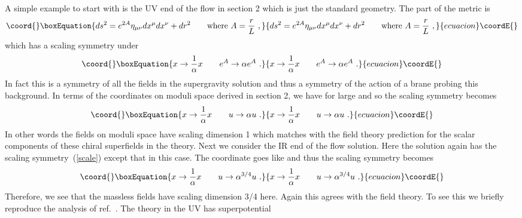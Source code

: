 \documentclass[a4paper,12pt]{article}
\providecommand{\labell}[1]{\label{#1}}
\begin{document}
A simple example to start with is the UV end of the flow in section 2
which is just the standard \coordHE{} geometry. The \coordHE{}
part of the metric is
\begin{equation}\coord{}\boxEquation{
  ds^2 = e^{2A} \eta_{\mu \nu} dx^\mu dx^\nu + dr^2 \qquad \mbox{where  } A = {r \over L}\ ,
}{
  ds^2 = e^{2A} \eta_{\mu \nu} dx^\mu dx^\nu + dr^2 \qquad \mbox{where  } A = {r \over L}\ ,
}{ecuacion}\coordE{}\end{equation}
which has a scaling symmetry under 
\begin{equation}\coord{}\boxEquation{
  x \rightarrow {1 \over \alpha} x \qquad e^{A} \rightarrow \alpha e^{A}\ .
  \labell{scale}
}{
  x \rightarrow {1 \over \alpha} x \qquad e^{A} \rightarrow \alpha e^{A}\ .
  \labell{scale}
}{ecuacion}\coordE{}\end{equation}
In fact this is a symmetry of all the fields in the supergravity
solution and thus a symmetry of the action of a brane probing this
background.  In terms of the coordinates on moduli space derived in
section 2, we have \coordHE{} for large \coordHE{} and so the scaling
symmetry becomes
\begin{equation}\coord{}\boxEquation{
 x \rightarrow {1 \over \alpha} x \qquad u \rightarrow \alpha u\  .
}{
 x \rightarrow {1 \over \alpha} x \qquad u \rightarrow \alpha u\  .
}{ecuacion}\coordE{}\end{equation}
In other words the fields on moduli space have scaling dimension 1
which matches with the field theory prediction for the scalar
components of these chiral superfields in the \coordHE{} theory.
Next we consider the IR end of the flow solution. Here the solution
again has the scaling symmetry~(\ref{scale}) except that \coordHE{} in this case. The coordinate \coordHE{} goes like \coordHE{} and thus the
scaling symmetry becomes
\begin{equation}\coord{}\boxEquation{
 x \rightarrow {1 \over \alpha} x \qquad u \rightarrow \alpha^{3/4} u\ .
}{
 x \rightarrow {1 \over \alpha} x \qquad u \rightarrow \alpha^{3/4} u\ .
}{ecuacion}\coordE{}\end{equation}
Therefore, we see that the massless fields have scaling dimension 3/4
here.  Again this agrees with the field theory. To see this we briefly
reproduce the analysis of ref.~\cite{robmatt, freed1,lsflow}.  The \coordHE{} theory in the UV has superpotential
\end{document}
